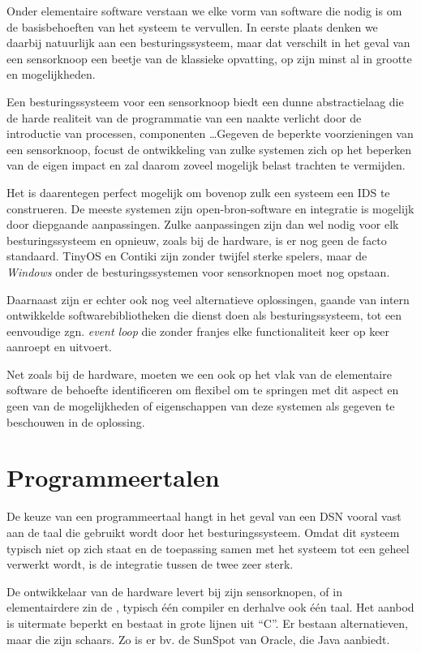 Onder elementaire software verstaan we elke vorm van software die nodig is om
de basisbehoeften van het systeem te vervullen. In eerste plaats denken we
daarbij natuurlijk aan een besturingssysteem, maar dat verschilt in het geval
van een sensorknoop een beetje van de klassieke opvatting, op zijn minst al in
grootte en mogelijkheden.

Een besturingssysteem voor een sensorknoop biedt een dunne abstractielaag die
de harde realiteit van de programmatie van een naakte \mcu verlicht door de
introductie van processen, componenten \dots Gegeven de beperkte voorzieningen
van een sensorknoop, focust de ontwikkeling van zulke systemen zich op het
beperken van de eigen impact en zal daarom zoveel mogelijk belast trachten te
vermijden.

Het is daarentegen perfect mogelijk om bovenop zulk een systeem een IDS te
construeren. De meeste systemen zijn open-bron-software en integratie is
mogelijk door diepgaande aanpassingen. Zulke aanpassingen zijn dan wel nodig
voor elk besturingssysteem en opnieuw, zoals bij de hardware, is er nog geen de
facto standaard. TinyOS en Contiki zijn zonder twijfel sterke spelers, maar de
\emph{Windows} onder de besturingssystemen voor sensorknopen moet nog opstaan.

Daarnaast zijn er echter ook nog veel alternatieve oplossingen, gaande van
intern ontwikkelde softwarebibliotheken die dienst doen als besturingssysteem,
tot een eenvoudige zgn. \emph{event loop} die zonder franjes elke
functionaliteit keer op keer aanroept en uitvoert.

Net zoals bij de hardware, moeten we een ook op het vlak van de elementaire
software de behoefte identificeren om flexibel om te springen met dit aspect en
geen van de mogelijkheden of eigenschappen van deze systemen als gegeven te
beschouwen in de oplossing.

\section{Programmeertalen}
\label{section:solution-proglang}

De keuze van een programmeertaal hangt in het geval van een DSN vooral vast aan
de taal die gebruikt wordt door het besturingssysteem. Omdat dit systeem
typisch niet op zich staat en de toepassing samen met het systeem tot een
geheel verwerkt wordt, is de integratie tussen de twee zeer sterk.

De ontwikkelaar van de hardware levert bij zijn sensorknopen, of in
elementairdere zin de \mcu, typisch \'e\'en compiler en derhalve ook \'e\'en
taal. Het aanbod is uitermate beperkt en bestaat in grote lijnen uit ``C''. Er
bestaan alternatieven, maar die zijn schaars. Zo is er bv. de SunSpot van
Oracle, die Java aanbiedt.

